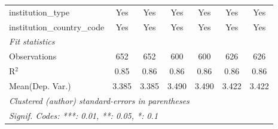 \begin{tabular}{lcccccc}
   institution\_type                  & Yes    & Yes     & Yes    & Yes    & Yes         & Yes\\  
   institution\_country\_code         & Yes    & Yes     & Yes    & Yes    & Yes         & Yes\\  
   \midrule
   \emph{Fit statistics}\\
   Observations                       & 652    & 652     & 600    & 600    & 626         & 626\\  
   R$^2$                              & 0.85   & 0.86    & 0.86   & 0.86   & 0.86        & 0.86\\  
Mean(Dep. Var.) & 3.385 & 3.385 & 3.490 & 3.490 & 3.422 & 3.422 \\
   \midrule \midrule
   \multicolumn{7}{l}{\emph{Clustered (author) standard-errors in parentheses}}\\
   \multicolumn{7}{l}{\emph{Signif. Codes: ***: 0.01, **: 0.05, *: 0.1}}\\
\end{tabular}
\par\endgroup
